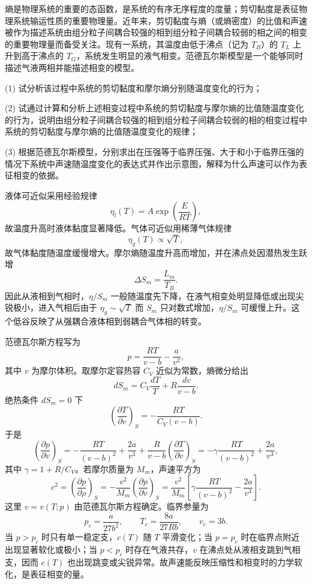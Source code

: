 \begin{question}
熵是物理系统的重要的态函数，是系统的有序无序程度的度量；剪切黏度是表征物理系统输运性质的重要物理量。近年来，剪切黏度与熵（或熵密度）的比值和声速被作为描述系统由组分粒子间耦合较强的相到组分粒子间耦合较弱的相之间的相变的重要物理量而备受关注。现有一系统，其温度由低于沸点（记为 $T_B$）的 $T_L$ 上升到高于沸点的 $T_G$，系统发生明显的液气相变。范德瓦尔斯模型是一个能够同时描述气液两相并能描述相变的模型。

(1) 试分析该过程中系统的剪切黏度和摩尔熵分别随温度变化的行为；

(2) 试通过计算和分析上述相变过程中系统的剪切黏度与摩尔熵的比值随温度变化的行为，说明由组分粒子间耦合较强的相到组分粒子间耦合较弱的相的相变过程中系统的剪切黏度与摩尔熵的比值随温度变化的规律；

(3) 根据范德瓦尔斯模型，分别求出在压强等于临界压强、大于和小于临界压强的情况下系统中声速随温度变化的表达式并作出示意图，解释为什么声速可以作为表征相变的依据。
\begin{solution}
液体可近似采用经验规律
\[
\eta_l(T)=A\exp\left(\frac{E}{RT}\right),
\]
故温度升高时液体黏度显著降低。气体可近似用稀薄气体规律
\[
\eta_g(T)\propto \sqrt T,
\]
故气体黏度随温度缓慢增大。摩尔熵随温度升高而增加，并在沸点处因潜热发生跃增
\[
\Delta S_m=\frac{L_m}{T_B}.
\]
因此从液相到气相时，$\eta/S_m$ 一般随温度先下降，在液气相变处明显降低或出现尖锐极小，进入气相后由于 $\eta_g\sim\sqrt T$ 而 $S_m$ 只对数式增加，$\eta/S_m$ 可缓慢上升。这个低谷反映了从强耦合液体相到弱耦合气体相的转变。

范德瓦尔斯方程写为
\[
p=\frac{RT}{v-b}-\frac{a}{v^2},
\]
其中 $v$ 为摩尔体积。取摩尔定容热容 $C_V$ 近似为常数，熵微分给出
\[
dS_m=C_V\frac{dT}{T}+R\frac{dv}{v-b}.
\]
绝热条件 $dS_m=0$ 下
\[
\left(\frac{\partial T}{\partial v}\right)_S=-\frac{RT}{C_V(v-b)}.
\]
于是
\[
\left(\frac{\partial p}{\partial v}\right)_S
=-\frac{RT}{(v-b)^2}+\frac{2a}{v^3}
+\frac{R}{v-b}\left(\frac{\partial T}{\partial v}\right)_S
=-\gamma\frac{RT}{(v-b)^2}+\frac{2a}{v^3},
\]
其中 $\gamma=1+R/C_V$。若摩尔质量为 $M_m$，声速平方为
\[
c^2=\left(\frac{\partial p}{\partial \rho}\right)_S
=-\frac{v^2}{M_m}\left(\frac{\partial p}{\partial v}\right)_S
=\frac{v^2}{M_m}\left[\gamma\frac{RT}{(v-b)^2}-\frac{2a}{v^3}\right].
\]
这里 $v=v(T;p)$ 由范德瓦尔斯方程确定。临界参量为
\[
p_c=\frac{a}{27b^2},\qquad T_c=\frac{8a}{27Rb},\qquad v_c=3b.
\]
当 $p>p_c$ 时只有单一稳定支，$c(T)$ 随 $T$ 平滑变化；当 $p=p_c$ 时在临界点附近出现显著软化或极小；当 $p<p_c$ 时存在气液共存，$v$ 在沸点处从液相支跳到气相支，因而 $c(T)$ 也出现跳变或尖锐异常。故声速能反映压缩性和相变时的力学软化，是表征相变的量。
\end{solution}
\end{question}

